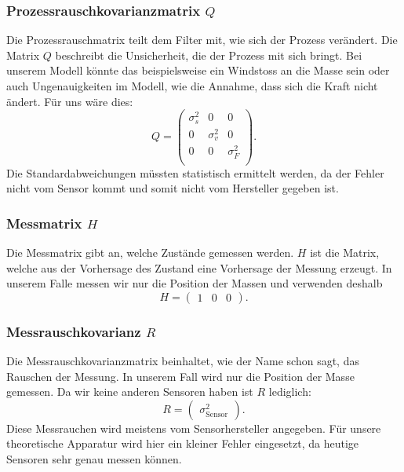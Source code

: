 \subsubsection*{Prozessrauschkovarianzmatrix $Q$}
Die Prozessrauschmatrix teilt dem Filter mit, wie sich der Prozess verändert. 
Die Matrix $Q$ beschreibt die Unsicherheit, die der Prozess mit sich bringt. 
Bei unserem Modell könnte das beispielsweise ein Windstoss an die Masse sein
oder auch Ungenauigkeiten im Modell, wie die Annahme, dass sich die Kraft nicht ändert.
Für uns wäre dies:
\[ 
Q =
 \begin{pmatrix}
\sigma_s^2& 0& 0 \\ 
0 & \sigma_v ^2& 0\\ 
0 & 0& \sigma_F^2\\
\end{pmatrix} .
 \]
Die Standardabweichungen müssten statistisch ermittelt werden, da der Fehler nicht vom Sensor kommt und somit nicht vom Hersteller gegeben ist. 

\subsubsection*{Messmatrix $H$}
Die Messmatrix gibt an, welche Zustände gemessen werden. 
$H$ ist die Matrix, welche aus der Vorhersage des Zustand eine Vorhersage der Messung erzeugt.
In unserem Falle messen wir nur die Position der Massen und verwenden deshalb
\[ 
H = \begin{pmatrix} 1 & 0 & 0 \end{pmatrix} .
\]

\subsubsection*{Messrauschkovarianz $R$}
Die Messrauschkovarianzmatrix beinhaltet, wie der Name schon sagt, das Rauschen der Messung. 
In unserem Fall wird nur die Position der Masse gemessen. Da wir keine anderen Sensoren haben ist $R$ lediglich:
\[ 
R= \begin{pmatrix}\sigma_\mathrm{Sensor}^2\end{pmatrix}.
 \] 
Diese Messrauchen wird meistens vom Sensorhersteller angegeben. 
Für unsere theoretische Apparatur wird hier ein kleiner Fehler eingesetzt,
da heutige Sensoren sehr genau messen können.

